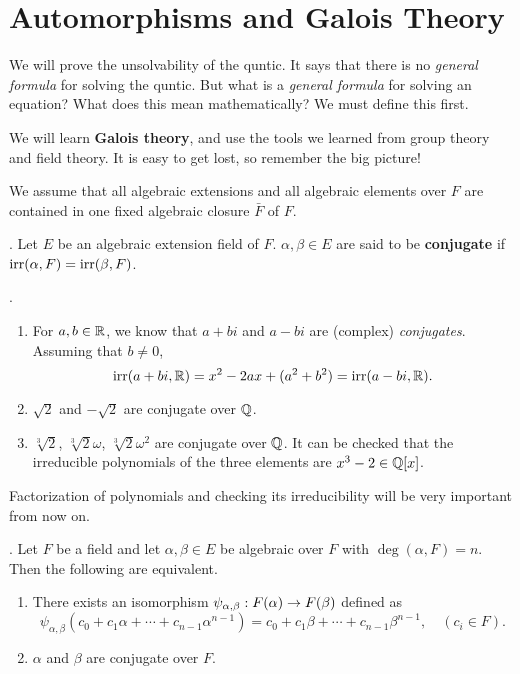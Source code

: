 \chapter{Automorphisms and Galois Theory}

We will prove the unsolvability of the quntic. It says that there is no \textit{general formula} for solving the quntic. But what is a \textit{general formula} for solving an equation? What does this mean mathematically? We must define this first.

We will learn \textbf{Galois theory}, and use the tools we learned from group theory and field theory. It is easy to get lost, so remember the big picture!

We assume that all algebraic extensions and all algebraic elements over \(F\) are contained in one fixed algebraic closure \(\bar{F}\) of \(F\).


.  Let \(E\) be an algebraic extension field of \(F\). \(\alpha, \beta \in E\) are said to be \textbf{conjugate} if \(\mathrm{irr}(\alpha, F) = \mathrm{irr}(\beta, F)\).

\ex.
\begin{enumerate}
    \item For \(a, b \in \mathbb{R}\), we know that \(a+bi\) and \(a-bi\) are (complex) \textit{conjugates}. Assuming that \(b \neq 0\),
          \[
              \mathrm{irr}(a + bi, \mathbb{R}) = x^2 - 2ax + (a^2 + b^2) = \mathrm{irr}(a - bi, \mathbb{R}).
          \]

    \item \(\sqrt{2}\) and \(-\sqrt{2}\) are conjugate over \(\mathbb{Q}\).
    \item \(\sqrt[3]{2}\), \(\sqrt[3]{2}\omega\), \(\sqrt[3]{2}\omega^2\) are conjugate over \(\mathbb{Q}\). It can be checked that the irreducible polynomials of the three elements are \(x^3 - 2 \in \mathbb{Q}[x]\).
\end{enumerate}

\rmk Factorization of polynomials and checking its irreducibility will be very important from now on.

\pagebreak

\thm.  Let \(F\) be a field and let \(\alpha, \beta \in E\) be algebraic over \(F\) with \(\deg(\alpha, F) = n\). Then the following are equivalent.
\begin{enumerate}
    \item There exists an isomorphism \(\psi_{\alpha, \beta} : F(\alpha) \rightarrow F(\beta)\) defined as
          \[
              \psi_{\alpha, \beta}(c_0 + c_1 \alpha + \cdots + c_{n-1} \alpha^{n-1}) = c_0 + c_1\beta + \cdots + c_{n-1} \beta^{n-1}, \quad (c_i \in F).
          \]

    \item \(\alpha\) and \(\beta\) are conjugate over \(F\).
\end{enumerate}

